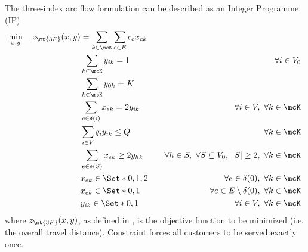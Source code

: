 The three-index arc flow formulation can be described as an Integer Programme (IP):
\begin{align}
	\min_{x, y} \quad z_\mt{3F}(x, y) & = \sum_{k \in \mcK} \sum_{e \in E} c_{e} x_{ek} & \label{eq:three-index-flow-obj-func}                                                                                    \\
	                                  & \sum_{k \in \mcK} y_{ik} = 1                    & \quad \forall i \in V_0 \label{eq:three-index-flow-all-customers-visited}                                               \\
	                                  & \sum_{k \in \mcK} y_{0k} = K                    & \label{eq:three-index-flow-tour-starts-and-ends-at-depot}                                                               \\
	                                  & \sum_{e \in \delta(i)} x_{ek} = 2 y_{ik}        & \quad \forall i \in V,\ \forall k \in \mcK \label{eq:three-index-flow-force-visited-customer-if-flow}                   \\
	                                  & \sum_{i \in V} q_i y_{ik} \le Q                 & \quad \forall k \in \mcK \label{eq:three-index-flow-force-resource-upper-bound}                                         \\
	                                  & \sum_{e \in \delta(S)} x_{ek} \ge 2 y_{hk}      & \quad \forall h \in S,\ \forall S \subseteq V_0,\ |S| \ge 2,\ \forall k \in \mcK \label{eq:three-index-flow-secv1}      \\
	                                  & x_{ek}                   \in \Set*{0, 1, 2}     & \quad \forall e \in \delta(0),\ \forall k \in \mcK             \label{eq:three-index-flow-x-mip-var-bounds-depot}       \\
	                                  & x_{ek}                   \in \Set*{0, 1}        & \quad \forall e \in E \setminus \delta(0),\ \forall k \in \mcK             \label{eq:three-index-flow-x-mip-var-bounds} \\
	                                  & y_{ik}                    \in \Set*{0, 1}       & \quad \forall i \in V,\ \forall k \in \mcK  \label{eq:three-index-flow-y-mip-var-bounds}
\end{align}
where $z_\mt{3F}(x, y)$, as defined in , is the objective function to be minimized (i.e. the overall travel distance).
Constraint  forces all customers to be served exactly once.
